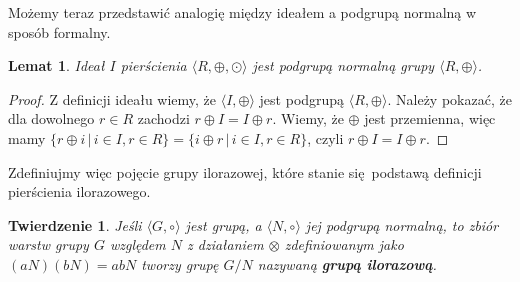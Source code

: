 \documentclass[declaration,shortabstract]{iithesis}
\theoremstyle{definition}
\theoremstyle{remark} \newtheorem{observation}{Obserwacja}
\theoremstyle{plain} \newtheorem{theorem}{Twierdzenie}
\theoremstyle{plain} \newtheorem{lemma}{Lemat}
\theoremstyle{remark} \newtheorem*{remark*}{Uwaga}
\theoremstyle{reminder} \newtheorem*{reminder*}{Przypomnienie}
\begin{document}
Możemy teraz przedstawić analogię między ideałem a podgrupą normalną w sposób formalny.

\begin{lemma}
	Ideał $I$ pierścienia $\langle R, \oplus, \odot \rangle$ jest podgrupą normalną grupy $\langle R, \oplus \rangle$.
\end{lemma}

\begin{proof}
	Z definicji ideału wiemy, że $\langle I, \oplus \rangle$ jest podgrupą $\langle R, \oplus \rangle$. \newline
	Należy pokazać, że dla dowolnego $r \in R$ zachodzi $r \oplus I = I \oplus r$. Wiemy, że $\oplus$ jest przemienna, więc mamy ${\{r \oplus i \, | \, i \in I, r \in R\}} = {\{i \oplus r \, | \, i \in I, r \in R\}}$, czyli $r \oplus I = I \oplus r$.
\end{proof}

Zdefiniujmy więc pojęcie grupy ilorazowej, które stanie się podstawą definicji pierścienia ilorazowego.

\theoremstyle{theorem}\label{grup_ilo}
\begin{theorem}
	Jeśli $\langle G, \circ \rangle$ jest grupą, a $\langle N, \circ \rangle$ jej podgrupą normalną, to zbiór warstw grupy $G$ względem $N$ z działaniem $\otimes$ zdefiniowanym jako $(aN)(bN) = abN$ tworzy grupę $G/N$ nazywaną \textbf{\textit{grupą ilorazową}}.
\end{theorem}
\end{document}
